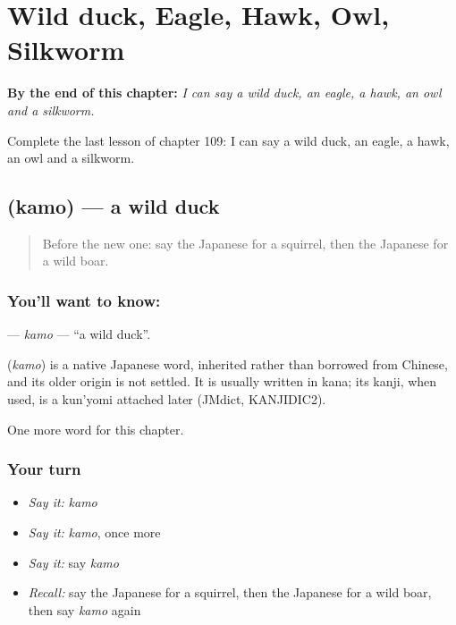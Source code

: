 
\chapter{Wild duck, Eagle, Hawk, Owl, Silkworm}
\label{ch:ja-wild-duck-eagle-hawk-owl-silkworm}

\begin{chapteropening}
\textbf{By the end of this chapter:} \emph{I can say a wild duck, an eagle, a hawk, an owl and a silkworm.}

Complete the last lesson of chapter 109: I can say a wild duck, an eagle, a hawk, an owl and a silkworm.
\end{chapteropening}

\section[\texorpdfstring{\ja{かも} (kamo)}{かも (kamo)}]{ (kamo) — a wild duck}

\label{lesson:JA-C109-kamo}



\begin{quote}
Before the new one: say the Japanese for a squirrel, then the Japanese for a wild boar.
\end{quote}

\subsection*{You'll want to know: }
\textbf{} — \emph{kamo} — \textquotedblleft{}a wild duck\textquotedblright{}.

\begin{cousinweb}
\textbf{} (\emph{kamo}) is a native Japanese word, inherited rather than borrowed from Chinese, and its older origin is not settled. It is usually written in kana; its kanji, when used, is a kun'yomi attached later (JMdict, KANJIDIC2).
\end{cousinweb}

\begin{grammarlens}[title={What you've built}]
One more word for this chapter.
\end{grammarlens}

\subsection*{Your turn}
\begin{itemize}
\raggedright
  \item \emph{Say it:} \emph{kamo}
  \item \emph{Say it:} \emph{kamo}, once more
  \item \emph{Say it:} say \emph{kamo}
  \item \emph{Recall:} say the Japanese for a squirrel, then the Japanese for a wild boar, then say \emph{kamo} again
\end{itemize}

